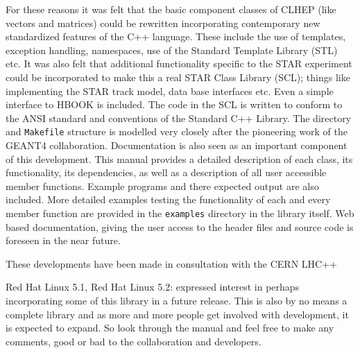 \documentclass[twoside]{article}
\newcommand{\comp}[1]{\texttt{#1}}%
\begin{document}
For these reasons it was felt that the basic component classes of CLHEP
(like vectors and matrices) could be rewritten incorporating contemporary
new standardized features of the C++
language.  These include the use of templates, exception handling, 
namespaces, use of the Standard Template Library (STL)
 etc.  It was also felt that additional functionality specific
to the STAR experiment could be incorporated to make this a real
STAR Class Library (SCL); things like implementing the STAR track model,
data base interfaces etc.  Even a simple interface to HBOOK is included.
The code in the SCL is written to conform to the ANSI standard
and conventions of the Standard C++ Library.  The directory 
and \texttt{Makefile} structure is modelled very closely after the
pioneering work of the GEANT4 collaboration.  Documentation is also seen as
an important component of this development.  This manual provides a detailed
description of each class, its functionality, its dependencies, as well as
a description of all user accessible member functions.  Example programs
and there expected output are also included.  More detailed examples
testing the functionality of each and every member function are provided in
the \comp{examples} directory in the library itself.  Web based documentation,
giving the user access to the header files and source code is foreseen
in the near future.

These developments have been made in consultation with the CERN LHC++
\item Red Hat Linux 5.1, Red Hat Linux 5.2: 
expressed interest in perhaps incorporating some of this library
in a future release.  This is also by no means a complete library and as
more and more people get involved with development, it is expected to
expand.  So look through the manual and feel free to
make any comments, good or bad to the collaboration and developers.
\end{document}
